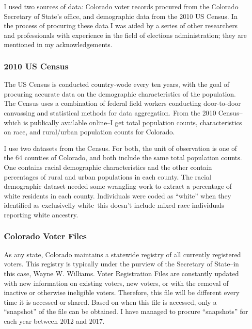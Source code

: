 \documentclass[12pt,twoside]{reedthesis}
\begin{document}
  I used two sources of data: Colorado voter records procured from the
  Colorado Secretary of State's office, and demographic data from the 2010
  US Census. In the process of procuring these data I was aided by a
  series of other researchers and professionals with experience in the
  field of elections administration; they are mentioned in my
  acknowledgements.
  
  \subsubsection{2010 US Census}\label{us-census}
  
  The US Census is conducted country-wode every ten years, with the goal
  of procuring accurate data on the demographic characteristics of the
  population. The Census uses a combination of federal field workers
  conducting door-to-door canvassing and statistical methods for data
  aggregation. From the 2010 Census--which is publically available
  online--I get total population counts, characteristics on race, and
  rural/urban population counts for Colorado.
  
  I use two datasets from the Census. For both, the unit of observation is
  one of the 64 counties of Colorado, and both include the same total
  population counts. One contains racial demographic characteristics and
  the other contain percentages of rural and urban populations in each
  county. The racial demographic dataset needed some wrangling work to
  extract a percentage of white residents in each county. Individuals were
  coded as ``white'' when they identified as exclusivelly white--this
  doesn't include mixed-race individuals reporting white ancestry.
  
  \subsubsection{Colorado Voter Files}\label{colorado-voter-files}
  
  As any state, Colorado maintains a statewide registry of all currently
  registered voters. This registry is typically under the purview of the
  Secretary of State--in this case, Wayne W. Williams. Voter Registration
  Files are constantly updated with new information on existing voters,
  new voters, or with the removal of inactive or otherwise ineligible
  voters. Therefore, this file will be different every time it is accessed
  or shared. Based on when this file is accessed, only a ``snapshot'' of
  the file can be obtained. I have managed to procure ``snapshots'' for
  each year between 2012 and 2017.
  
\end{document}
